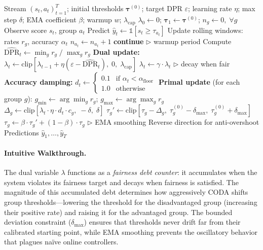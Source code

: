 \documentclass[letterpaper]{article} %
\theoremstyle{definition}
\begin{document}
\begin{algorithm}[t]
\caption{CODA Online Adaptation}
\label{alg:coda}
\begin{algorithmic}[1]
\REQUIRE Stream $(s_t, a_t)_{t=1}^T$; initial thresholds $\boldsymbol{\tau}^{(0)}$; target DPR $\varepsilon$; learning rate $\eta$; max step $\delta$; EMA coefficient $\beta$; warmup $w$; $\lambda_{\text{cap}}$
\STATE $\lambda_0 \gets 0$; $\boldsymbol{\tau}_1 \gets \boldsymbol{\tau}^{(0)}$; $n_g \gets 0, \; \forall g$
    \STATE Observe score $s_t$, group $a_t$
    \STATE Predict $\hat{y}_t \gets \mathbb{1}[s_t \geq \tau_{a_t}]$
    \STATE Update rolling windows: rates $r_g$, accuracy $\alpha_t$
    \STATE $n_{a_t} \gets n_{a_t} + 1$
        \STATE \textbf{continue} \hfill $\triangleright$ warmup period
    \ENDIF
    \STATE Compute $\widehat{\text{DPR}}_t \gets \min_g r_g \;/\; \max_g r_g$
    \STATE \textbf{Dual update:}
    \STATE $\lambda_t \gets \text{clip}\left[\lambda_{t-1} + \eta(\varepsilon - \widehat{\text{DPR}}_t), \; 0, \; \lambda_{\text{cap}}\right]$
        \STATE $\lambda_t \gets \gamma \cdot \lambda_t$ \hfill $\triangleright$ decay when fair
    \ENDIF
    \STATE \textbf{Accuracy damping:}
    \STATE $d_t \gets \begin{cases} 0.1 & \text{if } \alpha_t < \alpha_{\text{floor}} \\ 1.0 & \text{otherwise}\end{cases}$
    \STATE \textbf{Primal update} (for each group $g$):
    \STATE $g_{\min} \gets \arg\min_g r_g$; \quad $g_{\max} \gets \arg\max_g r_g$
    \STATE $\Delta_g \gets \text{clip}\left[\lambda_t \cdot \eta \cdot d_t \cdot c_g, \; -\delta, \; \delta\right]$
    \STATE $\tau_g' \gets \text{clip}\left[\tau_g - \Delta_g, \; \tau_g^{(0)} - \delta_{\max}, \; \tau_g^{(0)} + \delta_{\max}\right]$
    \STATE $\tau_g \gets \beta \cdot \tau_g' + (1-\beta) \cdot \tau_g$ \hfill $\triangleright$ EMA smoothing
        \STATE Reverse direction for anti-overshoot
    \ENDIF
\ENDFOR
\RETURN Predictions $\hat{y}_1, \ldots, \hat{y}_T$
\end{algorithmic}
\end{algorithm}

\paragraph{Intuitive Walkthrough.}
The dual variable $\lambda$ functions as a \emph{fairness debt counter}: it accumulates when the system violates its fairness target and decays when fairness is satisfied. The magnitude of this accumulated debt determines how aggressively CODA shifts group thresholds---lowering the threshold for the disadvantaged group (increasing their positive rate) and raising it for the advantaged group. The bounded deviation constraint ($\delta_{\max}$) ensures that thresholds never drift far from their calibrated starting point, while EMA smoothing prevents the oscillatory behavior that plagues na\"ive online controllers.
\end{document}
